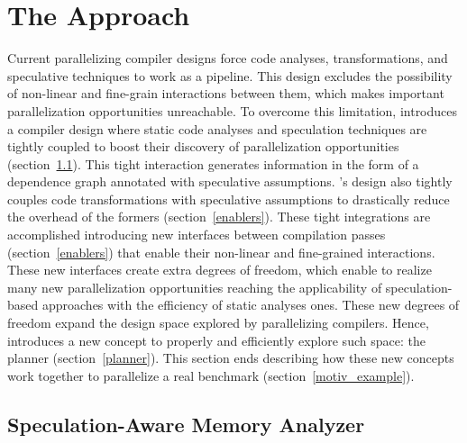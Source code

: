 \section{The \name Approach}
\label{sec:approach}

Current parallelizing compiler designs force code analyses, transformations, and speculative techniques to work as a pipeline.
This design excludes the possibility of non-linear and fine-grain interactions between them, which makes important parallelization opportunities unreachable.
To overcome this limitation, \name introduces a compiler design where static code analyses and speculation techniques are tightly coupled to boost their discovery of parallelization opportunities (section~\ref{analyzer}).
This tight interaction generates information in the form of a dependence graph annotated with speculative assumptions.
\name's design also tightly couples code transformations with speculative assumptions to drastically reduce the overhead of the formers (section~\ref{enablers}).
These tight integrations are accomplished introducing new interfaces between compilation passes (section~\ref{enablers}) that enable their non-linear and fine-grained interactions.
These new interfaces create extra degrees of freedom, which enable \name to realize many new parallelization opportunities reaching the applicability of speculation-based approaches with the efficiency of static analyses ones.
These new degrees of freedom expand the design space explored by parallelizing compilers.
Hence, \name introduces a new concept to properly and efficiently explore such space: the planner (section~\ref{planner}).
This section ends describing how these new concepts work together to parallelize a real benchmark (section~\ref{motiv_example}).



\subsection{Speculation-Aware Memory Analyzer}
\label{analyzer}

